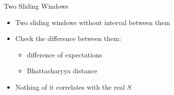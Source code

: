 \documentclass[hyperref=unicode,graphics=pdflatex,13pt]{beamer}
\begin{document}
\begin{frame}{Two Sliding Windows}
\begin{itemize}
   \item Two sliding windows without interval between them
   \item Check the difference between them:
   \begin{itemize}
      \item difference of expectations
      \item Bhattacharyya distance
   \end{itemize}
   \item Nothing of it correlates with the real $S$
\end{itemize}

\end{frame}
\end{document}
